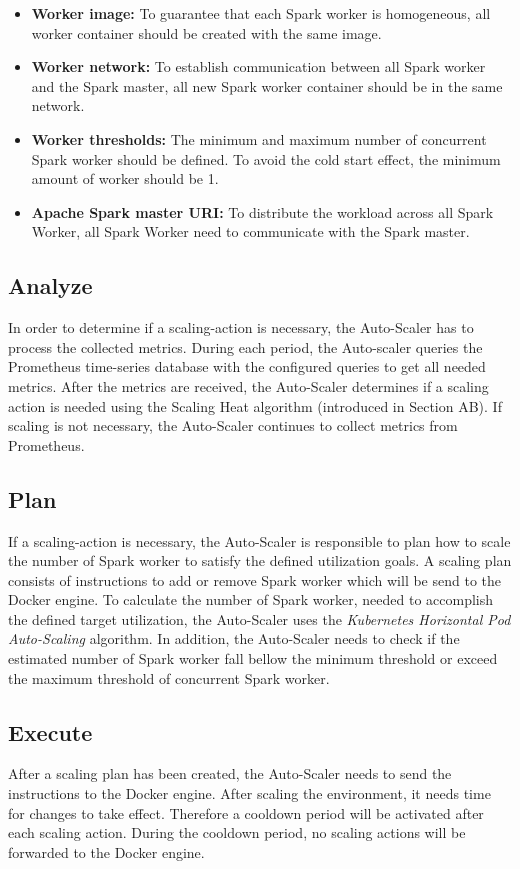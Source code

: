 \begin{itemize}
\item \textbf{Worker image:} To guarantee that each Spark worker is homogeneous, all worker container should be created with the same image.

\item \textbf{Worker network:} To establish communication between all Spark worker and the Spark master, all new Spark worker container should be in the same network.

\item \textbf{Worker thresholds:} The minimum and maximum number of concurrent Spark worker should be defined. To avoid the cold start effect, the minimum amount of worker should be 1. 

\item \textbf{Apache Spark master URI:} To distribute the workload across all Spark Worker, all Spark Worker need to communicate with the Spark master.
\end{itemize}


\subsection{Analyze}
In order to determine if a scaling-action is necessary, the Auto-Scaler has to process the collected metrics. 
During each period, the Auto-scaler queries the Prometheus time-series database with the configured queries to get all needed metrics. 
After the metrics are received, the Auto-Scaler determines if a scaling action is needed using the Scaling Heat algorithm (introduced in Section AB). If scaling is not necessary, the Auto-Scaler continues to collect metrics from Prometheus.


\subsection{Plan}
If a scaling-action is necessary, the Auto-Scaler is responsible to plan how to scale the number of Spark worker to satisfy the defined utilization goals.
A scaling plan consists of instructions to add or remove Spark worker which will be send to the Docker engine.
To calculate the number of Spark worker, needed to accomplish the defined target utilization, the Auto-Scaler uses the \textit{Kubernetes Horizontal Pod Auto-Scaling} algorithm. In addition, the Auto-Scaler needs to check if the estimated number of Spark worker fall bellow the minimum threshold or exceed the maximum threshold of concurrent Spark worker.


\subsection{Execute}
After a scaling plan has been created, the Auto-Scaler needs to send the instructions to the Docker engine.
After scaling the environment, it needs time for changes to take effect. Therefore a cooldown period will be activated after each scaling action.
During the cooldown period, no scaling actions will be forwarded to the Docker engine.
